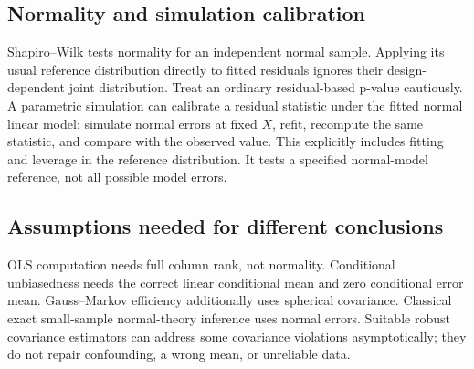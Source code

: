 \documentclass[11pt]{article}
\begin{document}
\subsection{Normality and simulation calibration}
Shapiro--Wilk tests normality for an independent normal sample. Applying its usual reference distribution directly to fitted residuals ignores their design-dependent joint distribution. Treat an ordinary residual-based p-value cautiously. A parametric simulation can calibrate a residual statistic under the fitted normal linear model: simulate normal errors at fixed $X$, refit, recompute the same statistic, and compare with the observed value. This explicitly includes fitting and leverage in the reference distribution. It tests a specified normal-model reference, not all possible model errors.
\subsection{Assumptions needed for different conclusions}
OLS computation needs full column rank, not normality. Conditional unbiasedness needs the correct linear conditional mean and zero conditional error mean. Gauss--Markov efficiency additionally uses spherical covariance. Classical exact small-sample normal-theory inference uses normal errors. Suitable robust covariance estimators can address some covariance violations asymptotically; they do not repair confounding, a wrong mean, or unreliable data.
\end{document}
